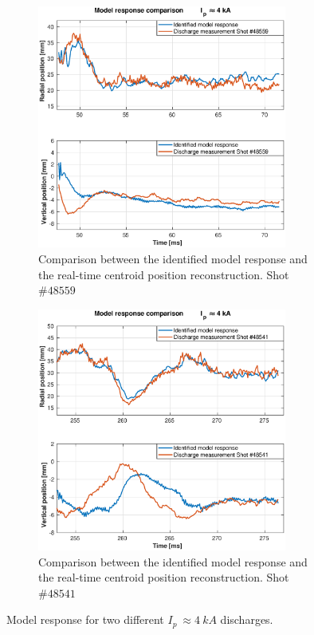\begin{figure}
	\begin{subfigure}[b]{0.5\textwidth}
		\includegraphics[height=8.0cm]{Chp5/SimResp_559.eps}  
		\caption{Comparison between the  identified model response and the real-time centroid position reconstruction. Shot $\#48559 $\label{SimResp559} }
	\end{subfigure}
	\hspace{0.45cm} %
	\begin{subfigure}[b]{0.5\textwidth}
		\includegraphics[height=8.0cm]{Chp5/SimResp_541.eps}        
		\caption{ Comparison between the  identified model response and the real-time centroid position reconstruction. Shot $\#48541 $ \label{SimResp541}}
	\end{subfigure}
	\caption{Model response for two different  $I_p~\approx 4~kA$ discharges. \label{SimResp_pos}}
\end{figure}


